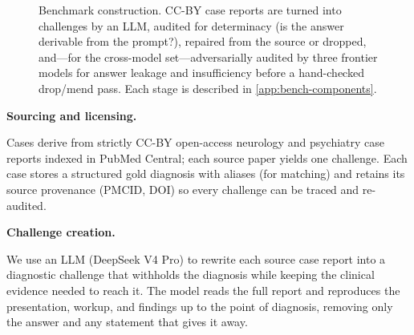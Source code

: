 \documentclass{article}
\renewcommand{\paragraph}[1]{%
  \par\addvspace{0.42\baselineskip}%
  \noindent\textbf{#1}\par\nobreak\vspace{-0.28\baselineskip}%
}
\begin{document}
\begin{figure}[t]
  \centering
  \caption{Benchmark construction. CC-BY case reports are turned into challenges by an LLM, audited for
  determinacy (is the answer derivable from the prompt?), repaired from the source or dropped, and---for the
  cross-model set---adversarially audited by three frontier models for answer leakage and insufficiency
  before a hand-checked drop/mend pass. Each stage is described in \ref{app:bench-components}.}
  \label{fig:benchmark}
\end{figure}

\paragraph{Sourcing and licensing.} Cases derive from strictly CC-BY open-access neurology and psychiatry
case reports indexed in PubMed Central; each source paper yields one challenge. Each case stores a structured
gold diagnosis with aliases (for matching) and retains its source provenance (PMCID, DOI) so every challenge
can be traced and re-audited.

\paragraph{Challenge creation.} We use an LLM (DeepSeek V4 Pro) to rewrite each source case report into a
diagnostic challenge that withholds the diagnosis while keeping the clinical evidence needed to reach it.
The model reads the full report and reproduces the presentation, workup, and findings up to the point of
diagnosis, removing only the answer and any statement that gives it away.
\end{document}
